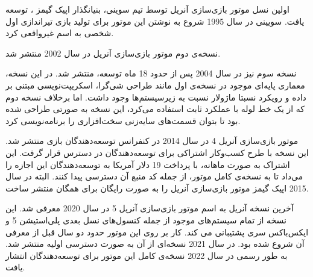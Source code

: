 اولین نسل موتور بازی‌سازی آنریل توسط تیم سوینی، بنیانگذار اپیک گیمز
،
توسعه یافت.
سویینی در سال 1995 شروع به نوشتن این موتور برای تولید بازی‌ تیراندازی اول شخصی به اسم غیرواقعی
کرد.


نسخه‌‌ی دوم موتور بازی‌سازی آنریل در سال 2002 منتشر شد. 

نسخه سوم نیز در سال 2004 پس از حدود 18 ماه توسعه، منتشر شد.
در این نسخه، معماری پایه‌ای موجود در نسخه‌ی اول مانند طراحی شی‌گرا، اسکریپت‌نویسی مبتنی بر داده و رویکرد نسبتا ماژولار نسبت به زیرسیستم‌ها وجود داشت.
اما برخلاف نسخه دوم که از یک خط لوله با عملکرد ثابت
استفاده می‌کرد، این نسخه به صورتی طراحی شده بود تا بتوان قسمت‌های سایه‌زنی سخت‌افزاری
را برنامه‌نویسی کرد.


موتور بازی‌سازی آنریل 4 در سال 2014 در کنفرانس توسعه‌دهندگان بازی
منتشر شد.
این نسخه با طرح کسب‌و‌کار اشتراکی برای توسعه‌دهندگان در دسترس قرار گرفت. این اشتراک به صورت ماهانه، با پرداخت 19 دلار آمریکا به توسعه‌دهندگان این اجازه را می‌داد تا به نسخه‌ی کامل موتور، از جمله کد منبع 
آن
دسترسی پیدا‌ کنند.
البته در سال 2015 اپیک گیمز موتور بازی‌سازی آنریل را به صورت رایگان برای همگان منتشر ساخت.

آخرین نسخه آنریل به اسم موتور بازی‌سازی آنریل 5 در سال 2020 معرفی شد. این نسخه از تمام سیستم‌های موجود از جمله کنسول‌های نسل بعدی پلی‌استیشن 5
و ایکس‌باکس سری 
پشتیبانی می کند.
کار بر روی این موتور حدود دو سال قبل از معرفی آن شروع شده بود. در سال 2021 نسخه‌ای از آن به صورت دسترسی اولیه منتشر شد. به طور رسمی در سال 2022 نسخه‌ی کامل این موتور برای توسعه‌دهندگان انتشار یافت.
\cite{UnrealEngineWikiPedia}
